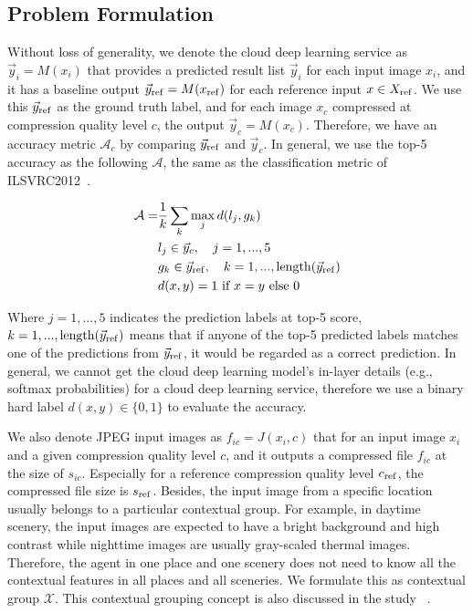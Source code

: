 \subsection{Problem Formulation}
\label{subsec: formulation}


Without loss of generality, we denote the cloud deep learning service as $ \vec{y}_i = M(x_i) $ that provides a predicted result list $ \vec{y}_i $ for each input image $ x_i $, and it has a baseline output $ \vec{y}_{\rm ref} = M(x_{\rm ref}) $ for each reference input $ x \in X_{\rm ref} $. We use this $ \vec{y}_{\rm ref} $ as the ground truth label, and for each image $ x_c $ compressed at compression quality level $ c $, the output $ \vec{y}_c = M(x_c) $. Therefore, we have an accuracy metric $ \mathcal{A}_c $ by comparing $ \vec{y}_{\rm ref} $ and $ \vec{y}_c $. In general, we use the top-5 accuracy as the following $ \mathcal{A} $, the same as the classification metric of ILSVRC2012~\cite{ILSVRC12}.

\begin{align}
\mathcal{A} =& \frac{1}{k} \sum_{k}\max_jd(l_j, g_k) \\
& l_j \in \vec{y}_c, \quad j=1,...,5 \\
& g_k \in \vec{y}_{\rm ref}, \quad k=1, ..., {\rm length}(\vec{y}_{\rm ref}) \\
& d(x, y) = 1 \ \text{if} \ x=y  \ \text{else} \ 0 
\end{align}

Where $ j = 1,...,5 $ indicates the prediction labels at top-5 score, $ k = 1,...,{\rm length}(\vec{y}_{\rm ref}) $ means that if anyone of the top-5 predicted labels matches one of the predictions from $ \vec{y}_{\rm ref} $, it would be regarded as a correct prediction. In general, we cannot get the cloud deep learning model's in-layer details (e.g., softmax probabilities) for a cloud deep learning service, therefore we use a binary hard label $ d(x, y) \in \{0, 1\} $ to evaluate the accuracy. %

We also denote JPEG input images as $ f_{ic} = J(x_i, c) $ that for an input image $ x_i $ and a given compression quality level $ c $, and it outputs a compressed file $ f_{ic} $ at the size of $ s_{ic} $. Especially for a reference compression quality level $ c_{\rm ref} $, the compressed file size is $ s_{\rm ref} $. Besides, the input image from a specific location usually belongs to a particular contextual group. For example, in daytime scenery, the input images are expected to have a bright background and high contrast while nighttime images are usually gray-scaled thermal images. Therefore, the agent in one place and one scenery does not need to know all the contextual features in all places and all sceneries. We formulate this as contextual group $ \mathcal{X} $. This contextual grouping concept is also discussed in the study ~\cite{mcdnn}.

